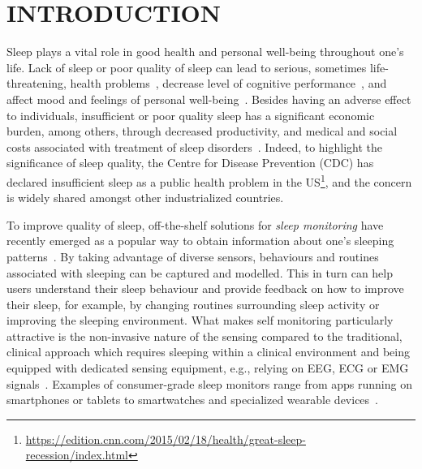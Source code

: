 \section{INTRODUCTION}\label{sec:1introduction}

Sleep plays a vital role in good health and personal well-being throughout one's life. Lack of sleep or poor quality of sleep can lead to
serious, sometimes life-threatening, health problems~\cite{altena2008sleep,chandola2010effect,lallukka2016contribution}, decrease level of cognitive performance~\cite{alhola07sleep,akerstedt07altered}, and affect mood and feelings of personal well-being~\cite{paunio09longitudinal,pilcher97sleep}.
Besides having an adverse effect to individuals, insufficient or poor quality sleep has a significant economic burden, among others, through decreased productivity, and medical and social costs associated with treatment of sleep disorders~\cite{hafner17why}. Indeed, to highlight the significance of sleep quality, the Centre for Disease Prevention (CDC) has declared insufficient sleep
as a public health problem in the US\footnote{\url{https://edition.cnn.com/2015/02/18/health/great-sleep-recession/index.html}}, and the concern is widely shared amongst other industrialized countries.

To improve quality of sleep, off-the-shelf solutions for \emph{sleep monitoring} have recently emerged as a popular way to obtain information about one's sleeping patterns~\cite{ko15consumer}. By taking advantage of diverse sensors, behaviours and routines associated with sleeping can be captured and modelled. This in turn can help users understand their sleep behaviour and provide feedback on how to improve their sleep, for example, by changing routines surrounding sleep activity or improving the sleeping environment. What makes self monitoring particularly attractive is the non-invasive nature of the sensing compared to the traditional, clinical approach which requires sleeping within a clinical environment and being equipped with dedicated sensing equipment, e.g., relying on EEG, ECG or EMG signals~\cite{ebrahimi2008automatic,saper2005hypothalamic,oropesa1999sleep,langkvist2012sleep}. Examples of consumer-grade sleep monitors range from apps running on smartphones or tablets to smartwatches and 
specialized wearable devices~\cite{zeo,Jawbone,SleepAndroid,fitbit,gu2016sleep,sleepmonitor}. 


